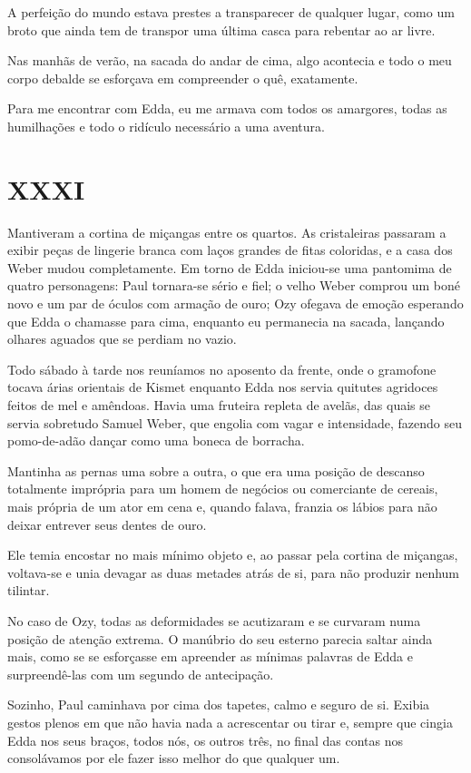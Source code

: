 A perfeição do mundo estava prestes a transparecer de qualquer lugar, como um broto que ainda tem de transpor uma última casca para rebentar ao ar livre.

Nas manhãs de verão, na sacada do andar de cima, algo acontecia e todo o meu corpo debalde se esforçava em compreender o quê, exatamente.

Para me encontrar com Edda, eu me armava com todos os amargores, todas as humilhações e todo o ridículo necessário a uma aventura.


\chapter*{\centering\Large{XXXI}}

Mantiveram a cortina de miçangas entre os quartos. As cristaleiras passaram a exibir peças de lingerie branca com laços grandes de fitas coloridas, e a casa dos Weber mudou completamente. Em torno de Edda iniciou-se uma pantomima de quatro personagens: Paul tornara-se sério e fiel; o velho Weber comprou um boné novo e um par de óculos com armação de ouro; Ozy ofegava de emoção esperando que Edda o chamasse para cima, enquanto eu permanecia na sacada, lançando olhares aguados que se perdiam no vazio.

Todo sábado à tarde nos reuníamos no aposento da frente, onde o gramofone tocava árias orientais de Kismet enquanto Edda nos servia quitutes agridoces feitos de mel e amêndoas. Havia uma fruteira repleta de avelãs, das quais se servia sobretudo Samuel Weber, que engolia com vagar e intensidade, fazendo seu pomo-de-adão dançar como uma boneca de borracha.

Mantinha as pernas uma sobre a outra, o que era uma posição de descanso totalmente imprópria para um homem de negócios ou comerciante de cereais, mais própria de um ator em cena e, quando falava, franzia os lábios para não deixar entrever seus dentes de ouro. 

Ele temia encostar no mais mínimo objeto e, ao passar pela cortina de miçangas, voltava-se e unia devagar as duas metades atrás de si, para não produzir nenhum tilintar.

No caso de Ozy, todas as deformidades se acutizaram e se curvaram numa posição de atenção extrema. O manúbrio do seu esterno parecia saltar ainda mais, como se se esforçasse em apreender as mínimas palavras de Edda e surpreendê-las com um segundo de antecipação.

Sozinho, Paul caminhava por cima dos tapetes, calmo e seguro de si. Exibia gestos plenos em que não havia nada a acrescentar ou tirar e, sempre que cingia Edda nos seus braços, todos nós, os outros três, no final das contas nos consolávamos por ele fazer isso melhor do que qualquer um.

